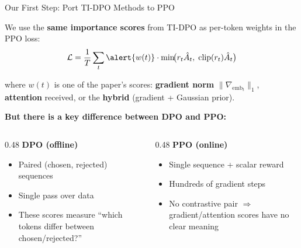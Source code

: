 \documentclass[aspectratio=169,10pt]{beamer}
\begin{document}
\begin{frame}{Our First Step: Port TI-DPO Methods to PPO}

We use the \textbf{same importance scores} from TI-DPO as per-token weights in the PPO loss:
\[
\mathcal{L} = \frac{1}{T}\sum_t \alert{w(t)} \cdot \min\!\bigl(r_t \hat{A}_t,\;\text{clip}(r_t)\hat{A}_t\bigr)
\]

where $w(t)$ is one of the paper's scores: \textbf{gradient norm} $\|\nabla_{\text{emb}_t}\|_1$, \textbf{attention} received, or the \textbf{hybrid} (gradient + Gaussian prior).

\vspace{0.3cm}
\textbf{But there is a key difference between DPO and PPO:}

\begin{columns}
\begin{column}{0.48\textwidth}
\textbf{DPO (offline)}
\begin{itemize}
    \item Paired (chosen, rejected) sequences
    \item Single pass over data
    \item These scores measure ``which tokens differ between chosen/rejected?''
\end{itemize}
\end{column}
\begin{column}{0.48\textwidth}
\textbf{PPO (online)}
\begin{itemize}
    \item Single sequence + scalar reward
    \item Hundreds of gradient steps
    \item No contrastive pair $\Rightarrow$ gradient/attention scores have no clear meaning
\end{itemize}
\end{column}
\end{columns}

\end{frame}
\end{document}
